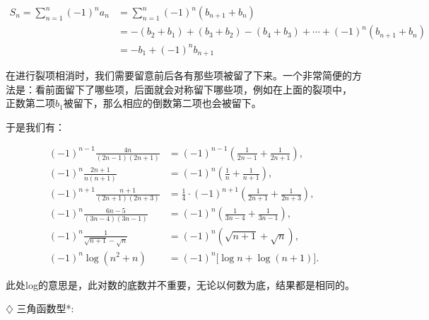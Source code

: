 \documentclass{article}
\begin{document}
\begin{align*}
S_n=\sum_{n=1}^n (-1)^na_n &=\sum_{n=1}^n (-1)^n(b_{n+1}+b_n) \\
&=-(b_2+b_1)+(b_3+b_2)-(b_4+b_3)+\cdots+(-1)^n(b_{n+1}+b_n) \\
&=-b_1+(-1)^nb_{n+1}
\end{align*}
 
\begin{tcolorbox}[colback=blue!10,colframe=blue!70!black,title=]
在进行裂项相消时，我们需要留意前后各有那些项被留了下来。一个非常简便的方法是：看前面留下了哪些项，后面就会对称留下哪些项，例如在上面的裂项中，
正数第二项$b_1$被留下，那么相应的倒数第二项也会被留下。
\end{tcolorbox}

于是我们有：

\begin{align*}
(-1)^{n-1} \frac{4n}{(2n-1)(2n+1)} &= (-1)^{n-1}\left( \frac{1}{2n-1} + \frac{1}{2n+1} \right), \\
(-1)^n \frac{2n+1}{n(n+1)} &= (-1)^n\left( \frac{1}{n} + \frac{1}{n+1} \right), \\
(-1)^{n+1} \frac{n+1}{(2n+1)(2n+3)} &= \frac{1}{4} \cdot (-1)^{n+1}\left( \frac{1}{2n+1} + \frac{1}{2n+3} \right), \\
(-1)^n \frac{6n-5}{(3n-4)(3n-1)} &= (-1)^n\left( \frac{1}{3n-4} + \frac{1}{3n-1} \right), \\
(-1)^n \frac{1}{\sqrt{n+1}-\sqrt{n}} &= (-1)^n\left( \sqrt{n+1} + \sqrt{n} \right), \\
(-1)^n \log(n^2 + n) &= (-1)^n\bigl[\log n + \log(n+1)\bigr].
\end{align*}

此处log的意思是，此对数的底数并不重要，无论以何数为底，结果都是相同的。

\newpage

$\diamondsuit$ 三角函数型*:
\vspace{1\baselineskip}
\end{document}
